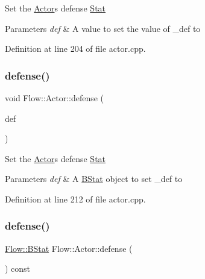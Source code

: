 Set the \hyperlink{class_flow_1_1_actor}{Actor}\textquotesingle{}s defense \hyperlink{class_flow_1_1_stat}{Stat} 
\begin{DoxyParams}{Parameters}
{\em def} & A value to set the value of \+\_\+def to \\
\hline
\end{DoxyParams}


Definition at line 204 of file actor.\+cpp.

\hypertarget{class_flow_1_1_actor_aba8a18fe7673cbd965d195e128067351}{}\label{class_flow_1_1_actor_aba8a18fe7673cbd965d195e128067351} 
\subsubsection{\texorpdfstring{defense()}{defense()}\hspace{0.1cm}{\footnotesize\ttfamily [2/3]}}
{\footnotesize\ttfamily void Flow\+::\+Actor\+::defense (\begin{DoxyParamCaption}\item[{const \hyperlink{class_flow_1_1_b_stat}{B\+Stat} \&}]{def }\end{DoxyParamCaption})}

Set the \hyperlink{class_flow_1_1_actor}{Actor}\textquotesingle{}s defense \hyperlink{class_flow_1_1_stat}{Stat} 
\begin{DoxyParams}{Parameters}
{\em def} & A \hyperlink{class_flow_1_1_b_stat}{B\+Stat} object to set \+\_\+def to \\
\hline
\end{DoxyParams}


Definition at line 212 of file actor.\+cpp.

\hypertarget{class_flow_1_1_actor_a70095802b129f53a2467e919e5e14c9b}{}\label{class_flow_1_1_actor_a70095802b129f53a2467e919e5e14c9b} 
\subsubsection{\texorpdfstring{defense()}{defense()}\hspace{0.1cm}{\footnotesize\ttfamily [3/3]}}
{\footnotesize\ttfamily \hyperlink{class_flow_1_1_b_stat}{Flow\+::\+B\+Stat} Flow\+::\+Actor\+::defense (\begin{DoxyParamCaption}{ }\end{DoxyParamCaption}) const}

